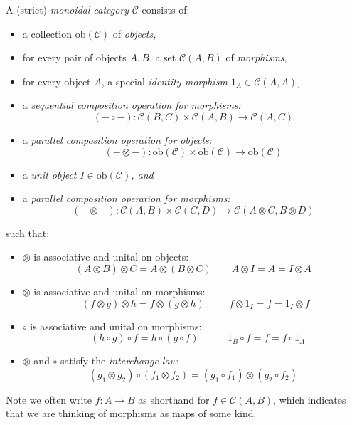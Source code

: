 \documentclass[10pt]{article}
\begin{document}
\begin{definition}\label{def:strict-monoidal}
  A (strict) \textit{monoidal category} $\mathcal C$ consists of: 
  \begin{itemize}
    \item a collection $\textrm{ob}(\mathcal C)$ of \textit{objects},
    \item for every pair of objects $A, B$, a set $\mathcal C(A,B)$ of \textit{morphisms},
    \item for every object $A$, a special \em identity morphism \em $1_A \in \mathcal C(A,A)$,
    \item a \em sequential composition \em operation for morphisms:
    \[ (- \circ -) : \mathcal C(B,C) \times \mathcal C(A,B) \to \mathcal C(A,C) \]
    \item a \em parallel composition \em operation for objects: 
\[  
(- \otimes -) : \textrm{ob}(\mathcal C) \times \textrm{ob}(\mathcal C) \to \textrm{ob}(\mathcal C)
\]
    \item a \em unit object \em $I \in \textrm{ob}(\mathcal C)$, and
    \item a \em parallel composition \em operation for morphisms:
    \[ 
    (- \otimes -) : \mathcal C(A,B) \times \mathcal C(C,D) \to \mathcal C(A\otimes C,B \otimes D) 
    \]  
  \end{itemize}
  such that:
  \begin{itemize}
    \item $\otimes$ is associative and unital on objects:
    \[ (A \otimes B) \otimes C = A \otimes (B \otimes C) \qquad A \otimes I = A = I \otimes A \]
    \item $\otimes$ is associative and unital on morphisms:
    \[ \ \  (f \otimes g) \otimes h = f \otimes (g \otimes h) \ \   \qquad f \otimes 1_I = f = 1_I \otimes f \]
    \item $\circ$ is associative and unital on morphisms:
    \[ \ \ \ \   (h \circ g) \circ f = h \circ (g \circ f) \ \ \ \   \qquad 1_B \circ f = f = f \circ 1_A \]
    \item $\otimes$ and $\circ$ satisfy the \textit{interchange law}:  
    \[ 
    (g_1\otimes g_2)\circ(f_1\otimes f_2) = (g_1\circ f_1)\otimes(g_2\circ f_2)
    \]
  \end{itemize}
\end{definition}

Note we often write $f : A \to B$ as shorthand for $f \in \mathcal C(A, B)$, which indicates that we are thinking of morphisms as maps of some kind.
\end{document}
